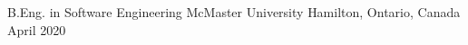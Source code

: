 


\begin{cventries}


\cventrynodesc
{B.Eng. in Software Engineering} %
{McMaster University} %
{Hamilton, Ontario, Canada} %
{April 2020} %


\end{cventries}